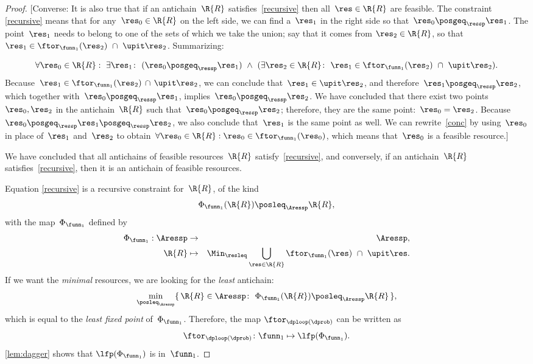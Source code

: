 \begin{proof}
{[}Converse: It is also true that if an antichain~$\R{R}$ satisfies~\eqref{recursive}
then all~$\res\in\R{R}$ are feasible. The constraint \eqref{recursive}
means that for any~$\res_{0}\in\R{R}$ on the left side, we can find
a~$\res_{1}$ in the right side so that~$\res_{0}\posgeq_{\ressp}\res_{1}$.
The point~$\res_{1}$ needs to belong to one of the sets of which
we take the union; say that it comes from $\res_{2}\in\R{R}$, so
that $\res_{1}\in\ftor_{\funn_{1}}(\res_{2})\ \cap\ \upit\res_{2}$.
Summarizing:

{\footnotesize{}
\begin{equation}
\forall\res_{0}\in\R{R}:\ \exists\res_{1}\colon\ (\res_{0}\posgeq_{\ressp}\res_{1})\ \wedge\ (\exists\res_{2}\in\R{R}\colon\ \res_{1}\in\ftor_{\funn_{1}}(\res_{2})\ \cap\ \upit\res_{2}).\label{eq:conc}
\end{equation}
}Because~$\res_{1}\in\ftor_{\funn_{1}}(\res_{2})\,\cap\,\upit\res_{2}$,
we can conclude that~$\res_{1}\in\upit\res_{2}$, and therefore~$\res_{1}\posgeq_{\ressp}\res_{2}$,
which together with~$\res_{0}\posgeq_{\ressp}\res_{1}$, implies~$\res_{0}\posgeq_{\ressp}\res_{2}$.
We have concluded that there exist two points~$\res_{0},\res_{2}$
in the antichain~$\R{R}$ such that~$\res_{0}\posgeq_{\ressp}\res_{2}$;
therefore, they are the same point:~$\res_{0}=\res_{2}$. Because~$\res_{0}\posgeq_{\ressp}\res_{1}\posgeq_{\ressp}\res_{2}$,
we also conclude that~$\res_{1}$ is the same point as well. We can
rewrite~\eqref{conc} by using~$\res_{0}$ in place of~$\res_{1}$
and~$\res_{2}$ to obtain~$\forall\res_{0}\in\R{R}:\res_{0}\in\ftor_{\funn_{1}}(\res_{0})$,
which means that~$\res_{0}$ is a feasible resource.{]}

We have concluded that all antichains of feasible resources~$\R{R}$
satisfy~\eqref{recursive}, and conversely, if an antichain~$\R{R}$
satisfies~\eqref{recursive}, then it is an antichain of feasible
resources.

Equation \eqref{recursive} is a recursive constraint for~$\R{R}$,
of the kind
\[
\Phi_{\funn_{1}}(\R{R})\posleq_{\Aressp}\R{R},
\]
with the map~$\Phi_{\funn_{1}}$ defined by
\begin{eqnarray}
\Phi_{\funn_{1}}:\Aressp & \rightarrow & \Aressp,\label{eq:bigphi}\\
\R{R} & \mapsto & \Min_{\resleq}\bigcup_{\res\in\R{R}}\ftor_{\funn_{1}}(\res)\ \cap\ \upit\res.\nonumber
\end{eqnarray}
If we want the \emph{minimal} resources, we are looking for the \emph{least}
antichain:
\[
\min_{\posleq_{\Aressp}}\{\,\R{R}\in\Aressp\colon\ \Phi_{\funn_{1}}(\R{R})\posleq_{\Aressp}\R{R}\,\},
\]
which is equal to the \emph{least fixed point }of~$\Phi_{\funn_{1}}$.
Therefore, the map $\ftor_{\dploop(\dprob)}$ can be written as
\begin{equation}
\ftor_{\dploop(\dprob)}\colon\funn_{1}\mapsto\lfp(\Phi_{\funn_{1}}).\label{eq:loop_fixpoint}
\end{equation}
\cref{lem:dagger} shows that $\lfp(\Phi_{\funn_{1}})$ is \scottcontinuous
in~$\funn_{1}$.
\end{proof}

